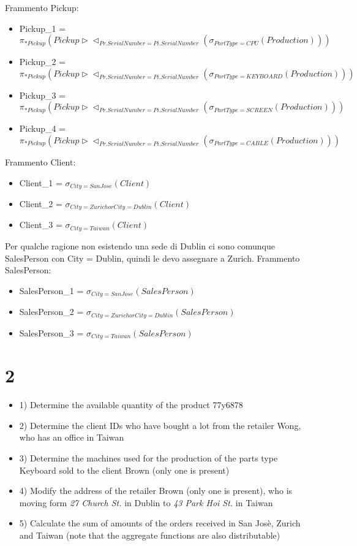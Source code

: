 Frammento Pickup:
\begin{itemize}
  \item Pickup\_1 = $\pi _ {*Pickup} (Pickup \triangleright \triangleleft _ {Pr.SerialNumber = Pi.SerialNumber} (\sigma _ {PartType = CPU} (Production)))$
  \item Pickup\_2 = $\pi _ {*Pickup} (Pickup \triangleright \triangleleft _ {Pr.SerialNumber = Pi.SerialNumber} (\sigma _ {PartType = KEYBOARD} (Production)))$
  \item Pickup\_3 = $\pi _ {*Pickup} (Pickup \triangleright \triangleleft _ {Pr.SerialNumber = Pi.SerialNumber} (\sigma _ {PartType = SCREEN} (Production)))$
  \item Pickup\_4 = $\pi _ {*Pickup} (Pickup \triangleright \triangleleft _ {Pr.SerialNumber = Pi.SerialNumber} (\sigma _ {PartType = CABLE} (Production)))$
\end{itemize}

Frammento Client:
\begin{itemize}
  \item Client\_1 = $\sigma _ {City = San Jose} (Client)$
  \item Client\_2 = $\sigma _ {City = Zurich or City = Dublin} (Client)$
  \item Client\_3 = $\sigma _ {City = Taiwan} (Client)$
\end{itemize}


Per qualche ragione non esistendo una sede di Dublin ci sono comunque SalesPerson con City = Dublin, quindi le devo assegnare a Zurich. Frammento SalesPerson:
\begin{itemize}
  \item SalesPerson\_1 = $\sigma _ {City = San Jose} (SalesPerson)$
  \item SalesPerson\_2 = $\sigma _ {City = Zurich or City = Dublin} (SalesPerson)$
  \item SalesPerson\_3 = $\sigma _ {City = Taiwan} (SalesPerson)$
\end{itemize}

\section{2}

\begin{itemize}
  \item 1) Determine the available quantity of the product 77y6878
  \item 2) Determine the client IDs who have bought a lot from the retailer Wong, who has an office in Taiwan
  \item 3) Determine the machines used for the production of the parts type Keyboard sold to the client Brown (only one is present)
  \item 4) Modify the address of the retailer Brown (only one is present), who is moving form \textit{27 Church St.} in Dublin to \textit{43 Park Hoi St.} in Taiwan
  \item 5) Calculate the sum of amounts of the orders received in San Josè, Zurich and Taiwan (note that the aggregate functions are also distributable)
\end{itemize}

